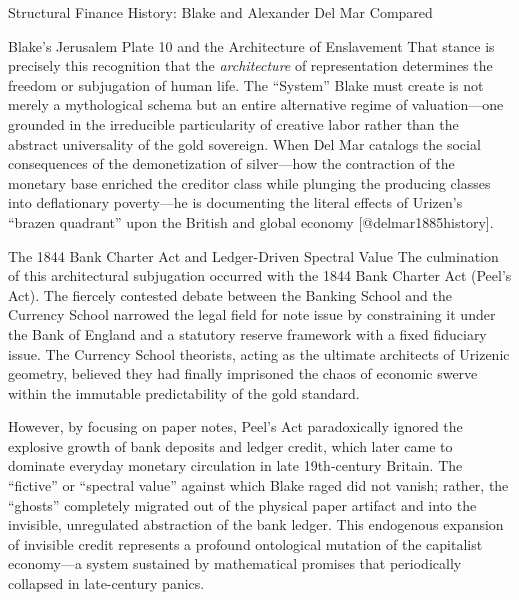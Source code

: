 \documentclass[
  ignorenonframetext,
]{beamer}
\begin{document}
\begin{frame}{Structural Finance History: Blake and Alexander Del Mar
Compared}
\begin{block}{Blake's Jerusalem Plate 10 and the Architecture of
Enslavement}
That stance is precisely this recognition that the \emph{architecture}
of representation determines the freedom or subjugation of human life.
The ``System'' Blake must create is not merely a mythological schema but
an entire alternative regime of valuation---one grounded in the
irreducible particularity of creative labor rather than the abstract
universality of the gold sovereign. When Del Mar catalogs the social
consequences of the demonetization of silver---how the contraction of
the monetary base enriched the creditor class while plunging the
producing classes into deflationary poverty---he is documenting the
literal effects of Urizen's ``brazen quadrant'' upon the British and
global economy {[}@delmar1885history{]}.
\end{block}

\begin{block}{The 1844 Bank Charter Act and Ledger-Driven Spectral
Value}
\protect{}\label{the-1844-bank-charter-act-and-ledger-driven-spectral-value}
The culmination of this architectural subjugation occurred with the 1844
Bank Charter Act (Peel's Act). The fiercely contested debate between the
Banking School and the Currency School narrowed the legal field for note
issue by constraining it under the Bank of England and a statutory
reserve framework with a fixed fiduciary issue. The Currency School
theorists, acting as the ultimate architects of Urizenic geometry,
believed they had finally imprisoned the chaos of economic swerve within
the immutable predictability of the gold standard.

However, by focusing on paper notes, Peel's Act paradoxically ignored
the explosive growth of bank deposits and ledger credit, which later
came to dominate everyday monetary circulation in late 19th-century
Britain. The ``fictive'' or ``spectral value'' against which Blake raged
did not vanish; rather, the ``ghosts'' completely migrated out of the
physical paper artifact and into the invisible, unregulated abstraction
of the bank ledger. This endogenous expansion of invisible credit
represents a profound ontological mutation of the capitalist economy---a
system sustained by mathematical promises that periodically collapsed in
late-century panics.
\end{block}


\end{frame}
\end{document}
